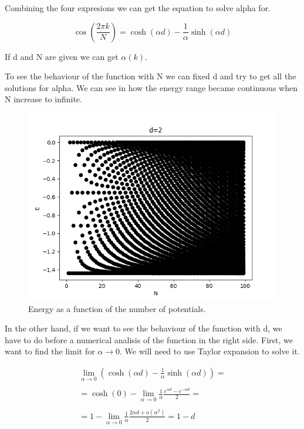 Combining the four expresions we can get the equation to solve alpha for.

\begin{equation}
  \label{5.23}
  \cos{\left(\frac{2\pi k}{N}\right)} = \cosh{(\alpha d)} - \frac{1}{\alpha} \sinh{(\alpha d)}
\end{equation}

If d and N are given we can get $\alpha(k)$.

To see the behaviour of the function with N we can fixed d and try to get all the solutions for alpha. We can see in  how the energy range became continuous when N increase to infinite.

\begin{figure}[H]
  \includegraphics{images5/E_d=2_N.png}
  \centering
  \caption{Energy as a function of the number of potentials.}
\end{figure}

In the other hand, if we want to see the behaviour of the function with d, we have to do before a numerical analisis of the function in the right side. First, we want to find the limit for $\alpha \to 0$. We will need to use Taylor expansion to solve it.

\begin{equation}
  \label{5.24}
  \begin{array}{c}
    \lim_{\alpha \to 0} (\cosh{(\alpha d)} - \frac{1}{\alpha} \sinh{(\alpha d)}) =
    \\

    \\
    = \cosh{(0)} - \lim_{\alpha \to 0} \frac{1}{\alpha} \frac{e^{\alpha d}-e^{-\alpha d}}{2} =
    \\

    \\
    = 1 - \lim_{\alpha \to 0} \frac{1}{\alpha} \frac{2\alpha d + o(\alpha^2)}{2} = 1-d
  \end{array}
\end{equation}

